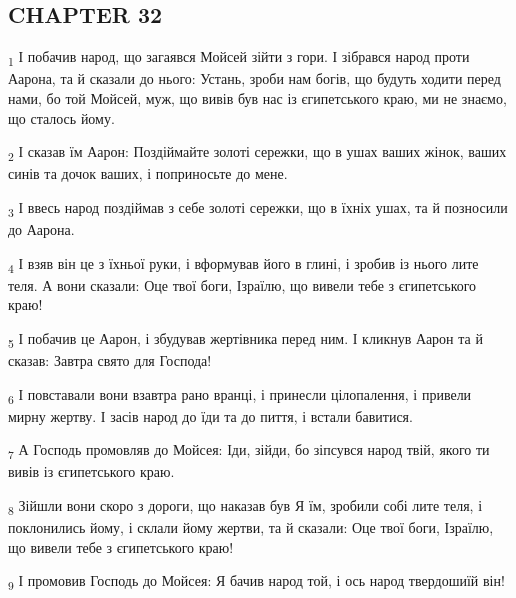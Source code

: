 \subsection{CHAPTER 32}
\begin{tcolorbox}
\textsubscript{1} І побачив народ, що загаявся Мойсей зійти з гори. І зібрався народ проти Аарона, та й сказали до нього: Устань, зроби нам богів, що будуть ходити перед нами, бо той Мойсей, муж, що вивів був нас із єгипетського краю, ми не знаємо, що сталось йому.
\end{tcolorbox}
\begin{tcolorbox}
\textsubscript{2} І сказав їм Аарон: Поздіймайте золоті сережки, що в ушах ваших жінок, ваших синів та дочок ваших, і поприносьте до мене.
\end{tcolorbox}
\begin{tcolorbox}
\textsubscript{3} І ввесь народ поздіймав з себе золоті сережки, що в їхніх ушах, та й позносили до Аарона.
\end{tcolorbox}
\begin{tcolorbox}
\textsubscript{4} І взяв він це з їхньої руки, і вформував його в глині, і зробив із нього лите теля. А вони сказали: Оце твої боги, Ізраїлю, що вивели тебе з єгипетського краю!
\end{tcolorbox}
\begin{tcolorbox}
\textsubscript{5} І побачив це Аарон, і збудував жертівника перед ним. І кликнув Аарон та й сказав: Завтра свято для Господа!
\end{tcolorbox}
\begin{tcolorbox}
\textsubscript{6} І повставали вони взавтра рано вранці, і принесли цілопалення, і привели мирну жертву. І засів народ до їди та до пиття, і встали бавитися.
\end{tcolorbox}
\begin{tcolorbox}
\textsubscript{7} А Господь промовляв до Мойсея: Іди, зійди, бо зіпсувся народ твій, якого ти вивів із єгипетського краю.
\end{tcolorbox}
\begin{tcolorbox}
\textsubscript{8} Зійшли вони скоро з дороги, що наказав був Я їм, зробили собі лите теля, і поклонились йому, і склали йому жертви, та й сказали: Оце твої боги, Ізраїлю, що вивели тебе з єгипетського краю!
\end{tcolorbox}
\begin{tcolorbox}
\textsubscript{9} І промовив Господь до Мойсея: Я бачив народ той, і ось народ твердошиїй він!
\end{tcolorbox}

